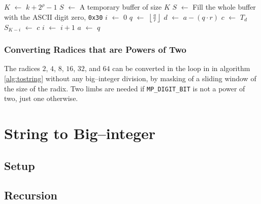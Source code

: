 \documentclass[a4paper,10pt]{article}
\newcommand*\Let[2]{\State #1 $\gets$ #2}
\providecommand{\floor}[1]{\left\lfloor#1\right\rfloor}
\theoremstyle{plain} %
\theoremstyle{definition}
\theoremstyle{remark}
\newcommand*{\smalltt}[1]{\small\texttt{#1}}
\begin{document}
\begin{center}
\begin{minipage}{.9\linewidth}
  \begin{algorithmic}[1]
    \Let{$K$}{$k + 2^\rho - 1$}
    \Let{$S$}{A temporary buffer of size $K$}
    \Let{$S$}{Fill the whole buffer with the ASCII digit zero, \smalltt{0x30}}
    \Let{$i$}{$0$}
       \Let{$q$}{$\floor{\frac{a}{r}}$} 
       \Let{$d$}{$a - \left(q \cdot r\right)$}
       \Let{$c$}{$T_d$}
       \Let{$S_{K-i}$}{$c$}
       \Let{$i$}{$i + 1$}
       \Let{$a$}{$q$}
    \EndWhile
    \EndFunction
  \end{algorithmic}
\end{minipage}
\end{center}

\subsubsection{Converting Radices that are Powers of Two}
The radices $2$, $4$, $8$, $16$, $32$, and $64$ can be converted in the loop in in algorithm \ref{alg:tostring} without any big--integer division, by masking of a sliding window of the size of the radix. Two limbs are needed if \smalltt{MP\_DIGIT\_BIT} is not a power of two, just one otherwise.



\section{String to Big--integer}


\subsection{Setup}
\subsection{Recursion}
\end{document}
